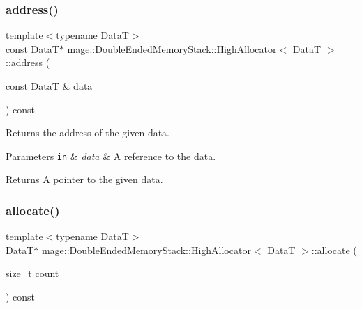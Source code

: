 \subsubsection{\texorpdfstring{address()}{address()}\hspace{0.1cm}{\footnotesize\ttfamily [2/2]}}
{\footnotesize\ttfamily template$<$typename DataT$>$ \\
const DataT$\ast$ \hyperlink{structmage_1_1_double_ended_memory_stack_1_1_high_allocator}{mage\+::\+Double\+Ended\+Memory\+Stack\+::\+High\+Allocator}$<$ DataT $>$\+::address (\begin{DoxyParamCaption}\item[{const DataT \&}]{data }\end{DoxyParamCaption}) const\hspace{0.3cm}{\ttfamily [noexcept]}}

Returns the address of the given data.


\begin{DoxyParams}[1]{Parameters}
\mbox{\tt in}  & {\em data} & A reference to the data. \\
\hline
\end{DoxyParams}
\begin{DoxyReturn}{Returns}
A pointer to the given data. 
\end{DoxyReturn}
\hypertarget{structmage_1_1_double_ended_memory_stack_1_1_high_allocator_ab6585eebb7bb11dcee1945b11b50ea98}{}\label{structmage_1_1_double_ended_memory_stack_1_1_high_allocator_ab6585eebb7bb11dcee1945b11b50ea98} 
\subsubsection{\texorpdfstring{allocate()}{allocate()}\hspace{0.1cm}{\footnotesize\ttfamily [1/2]}}
{\footnotesize\ttfamily template$<$typename DataT$>$ \\
DataT$\ast$ \hyperlink{structmage_1_1_double_ended_memory_stack_1_1_high_allocator}{mage\+::\+Double\+Ended\+Memory\+Stack\+::\+High\+Allocator}$<$ DataT $>$\+::allocate (\begin{DoxyParamCaption}\item[{size\+\_\+t}]{count }\end{DoxyParamCaption}) const}

